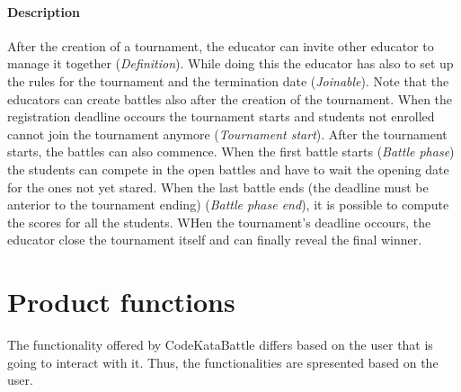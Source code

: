 \documentclass[12pt, a4paper]{report}
\begin{document}
    \paragraph*{Description}
    After the creation of a tournament, the educator can invite other educator to manage it together (\textit{Definition}). 
    While doing this the educator has also to set up the rules for the tournament and the termination date (\textit{Joinable}).
    Note that the educators can create battles also after the creation of the tournament.
    When the registration deadline occours the tournament starts and students not enrolled cannot join the tournament anymore (\textit{Tournament start}). 
    After the tournament starts, the battles can also commence. 
    When the first battle starts (\textit{Battle phase}) the students can compete in the open battles and have to wait the opening date for the ones not yet stared. 
    When the last battle ends (the deadline must be anterior to the tournament ending) (\textit{Battle phase end}), it is possible to compute the scores for all the students. 
    WHen the tournament's deadline occours, the educator close the tournament itself and can finally reveal the final winner. 

    \section{Product functions}
    The functionality offered by CodeKataBattle differs based on the user that is going to interact with it. 
    Thus, the functionalities are spresented based on the user. 
    
\end{document}
